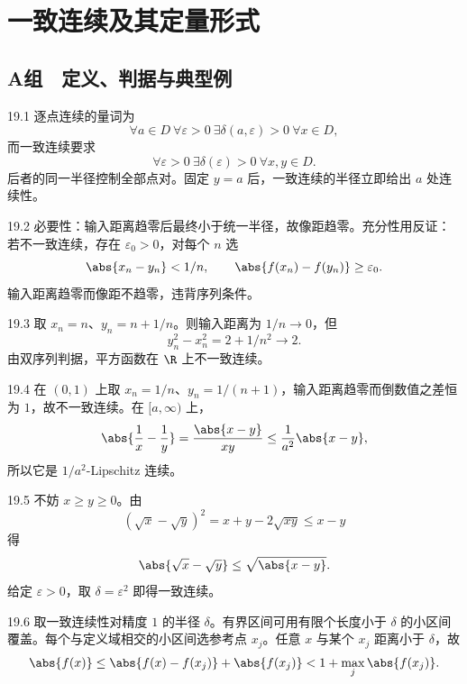 \chapter{一致连续及其定量形式}

\section*{A组　定义、判据与典型例}

\begin{solution}{19.1}
逐点连续的量词为
\[
 \forall a\in D\ \forall\varepsilon>0\ \exists\delta(a,\varepsilon)>0
\ \forall x\in D,
\]
而一致连续要求
\[
 \forall\varepsilon>0\ \exists\delta(\varepsilon)>0
\ \forall x,y\in D.
\]
后者的同一半径控制全部点对。固定 \(y=a\) 后，一致连续的半径立即给出 \(a\) 处连续性。
\end{solution}

\begin{solution}{19.2}
必要性：输入距离趋零后最终小于统一半径，故像距趋零。充分性用反证：若不一致连续，存在 \(\varepsilon_0>0\)，对每个 \(n\) 选
\[
 \abs{x_n-y_n}<1/n,\qquad
 \abs{f(x_n)-f(y_n)}\ge\varepsilon_0.
\]
输入距离趋零而像距不趋零，违背序列条件。
\end{solution}

\begin{solution}{19.3}
取 \(x_n=n\)、\(y_n=n+1/n\)。则输入距离为 \(1/n\to0\)，但
\[
 y_n^2-x_n^2=2+1/n^2\to2.
\]
由双序列判据，平方函数在 \(\R\) 上不一致连续。
\end{solution}

\begin{solution}{19.4}
在 \((0,1)\) 上取 \(x_n=1/n\)、\(y_n=1/(n+1)\)，输入距离趋零而倒数值之差恒为 \(1\)，故不一致连续。在 \([a,\infty)\) 上，
\[
 \abs{\frac1x-\frac1y}
 =\frac{\abs{x-y}}{xy}
 \le\frac1{a^2}\abs{x-y},
\]
所以它是 \(1/a^2\)-Lipschitz 连续。
\end{solution}

\begin{solution}{19.5}
不妨 \(x\ge y\ge0\)。由
\[
 (\sqrt x-\sqrt y)^2
 =x+y-2\sqrt{xy}\le x-y
\]
得
\[
 \abs{\sqrt x-\sqrt y}\le\sqrt{\abs{x-y}}.
\]
给定 \(\varepsilon>0\)，取 \(\delta=\varepsilon^2\) 即得一致连续。
\end{solution}

\begin{solution}{19.6}
取一致连续性对精度 \(1\) 的半径 \(\delta\)。有界区间可用有限个长度小于 \(\delta\) 的小区间覆盖。每个与定义域相交的小区间选参考点 \(x_j\)。任意 \(x\) 与某个 \(x_j\) 距离小于 \(\delta\)，故
\[
 \abs{f(x)}\le\abs{f(x)-f(x_j)}+\abs{f(x_j)}
 <1+\max_j\abs{f(x_j)}.
\]
\end{solution}

